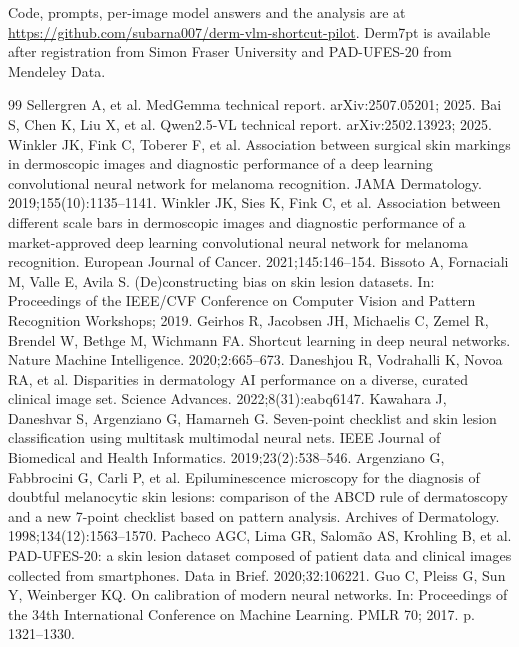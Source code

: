 \documentclass[11pt,a4paper]{article}
\begin{document}
Code, prompts, per-image model answers and the analysis are at\\\url{https://github.com/subarna007/derm-vlm-shortcut-pilot}. Derm7pt is available after registration from Simon Fraser University and PAD-UFES-20 from Mendeley Data.

\begin{thebibliography}{99}\small
{} Sellergren A, et al. MedGemma technical report. arXiv:2507.05201; 2025.
 Bai S, Chen K, Liu X, et al. Qwen2.5-VL technical report. arXiv:2502.13923; 2025.
 Winkler JK, Fink C, Toberer F, et al. Association between surgical skin markings in dermoscopic images and diagnostic performance of a deep learning convolutional neural network for melanoma recognition. JAMA Dermatology. 2019;155(10):1135--1141.
 Winkler JK, Sies K, Fink C, et al. Association between different scale bars in dermoscopic images and diagnostic performance of a market-approved deep learning convolutional neural network for melanoma recognition. European Journal of Cancer. 2021;145:146--154.
 Bissoto A, Fornaciali M, Valle E, Avila S. (De)constructing bias on skin lesion datasets. In: Proceedings of the IEEE/CVF Conference on Computer Vision and Pattern Recognition Workshops; 2019.
 Geirhos R, Jacobsen JH, Michaelis C, Zemel R, Brendel W, Bethge M, Wichmann FA. Shortcut learning in deep neural networks. Nature Machine Intelligence. 2020;2:665--673.
 Daneshjou R, Vodrahalli K, Novoa RA, et al. Disparities in dermatology AI performance on a diverse, curated clinical image set. Science Advances. 2022;8(31):eabq6147.
 Kawahara J, Daneshvar S, Argenziano G, Hamarneh G. Seven-point checklist and skin lesion classification using multitask multimodal neural nets. IEEE Journal of Biomedical and Health Informatics. 2019;23(2):538--546.
 Argenziano G, Fabbrocini G, Carli P, et al. Epiluminescence microscopy for the diagnosis of doubtful melanocytic skin lesions: comparison of the ABCD rule of dermatoscopy and a new 7-point checklist based on pattern analysis. Archives of Dermatology. 1998;134(12):1563--1570.
 Pacheco AGC, Lima GR, Salom\~ao AS, Krohling B, et al. PAD-UFES-20: a skin lesion dataset composed of patient data and clinical images collected from smartphones. Data in Brief. 2020;32:106221.
 Guo C, Pleiss G, Sun Y, Weinberger KQ. On calibration of modern neural networks. In: Proceedings of the 34th International Conference on Machine Learning. PMLR 70; 2017. p. 1321--1330.
\end{thebibliography}
\end{document}
